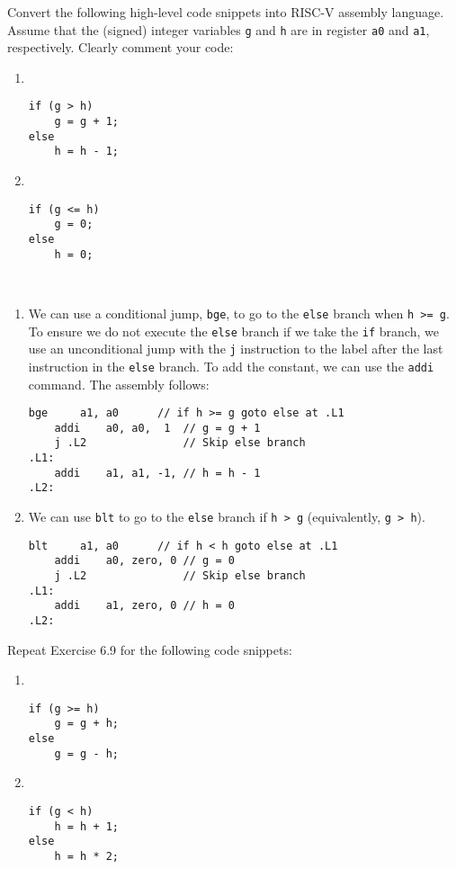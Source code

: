 \documentclass[12pt]{article}
\newenvironment{ex}[2][Exercise]{\begin{trivlist}
		\item[\hskip \labelsep {\bfseries #1}\hskip \labelsep {\bfseries #2.}]}{\end{trivlist}}
\newenvironment{sol}[1][Solution]{\begin{trivlist}
		\item[\hskip \labelsep {\bfseries #1:}]}{\end{trivlist}}
\begin{document}
\begin{ex}{6.9}
	Convert the following high-level code snippets into RISC-V assembly language. Assume that the (signed)
	integer variables \texttt{g} and \texttt{h} are in register \texttt{a0} and \texttt{a1}, respectively.
	Clearly comment your code:
	\begin{enumerate}[label=(\alph*)]
		\item 
		\
		\begin{lstlisting}
if (g > h)
	g = g + 1;
else
	h = h - 1;
		\end{lstlisting}
		\item
		\
		\begin{lstlisting}
if (g <= h)
	g = 0;
else
	h = 0;
		\end{lstlisting}
	\end{enumerate}
\end{ex}

\begin{sol}
	\
	\begin{enumerate}[label=(\alph*)]
		\item We can use a conditional jump, \texttt{bge}, to go to the \texttt{else} branch when \texttt{h >= g}.
		To ensure we do not execute the \texttt{else} branch if we take the \texttt{if} branch, we use
		an unconditional jump with the \texttt{j} instruction to the label after the last instruction in the
		\texttt{else} branch. To add the constant, we can use the \texttt{addi} command. The assembly follows:
		\begin{lstlisting}[language={}]
	bge		a1, a0		// if h >= g goto else at .L1
	addi	a0, a0,  1	// g = g + 1
	j .L2				// Skip else branch
.L1: 
	addi	a1, a1, -1,	// h = h - 1
.L2:
		\end{lstlisting}
		\item We can use \texttt{blt} to go to the \texttt{else} branch if \texttt{h > g} (equivalently,
		\texttt{g > h}).
		\begin{lstlisting}[language={}]
	blt		a1, a0		// if h < h goto else at .L1
	addi 	a0, zero, 0	// g = 0
	j .L2				// Skip else branch
.L1:
	addi	a1, zero, 0 // h = 0
.L2:
		\end{lstlisting}
	\end{enumerate}
\end{sol}

\begin{ex}{6.10}
	Repeat Exercise 6.9 for the following code snippets:
	\begin{enumerate}[label=(\alph*)]
		\item 
		\
		\begin{lstlisting}
if (g >= h)
	g = g + h;
else
	g = g - h;
		\end{lstlisting}
		\item 
		\
		\begin{lstlisting}
if (g < h)
	h = h + 1;
else
	h = h * 2;
		\end{lstlisting}
	\end{enumerate}
\end{ex}
\end{document}
